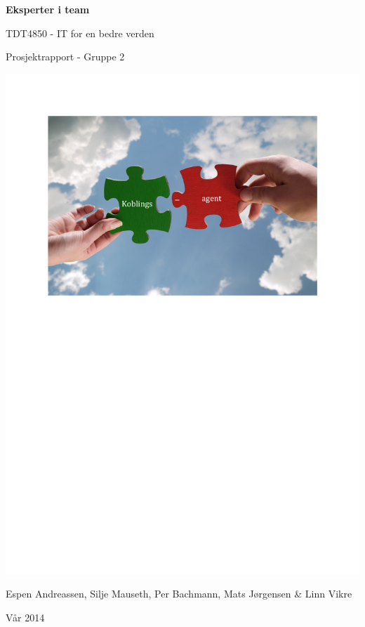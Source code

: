 \begin{titlepage}
\begin{center}
{\Huge {\bf Eksperter i team}}
\par
\vspace{0.1in}
{\LARGE TDT4850 - IT for en bedre verden}
\par
{\LARGE Prosjektrapport - Gruppe 2}
\par

\vspace{0.35in}

\includegraphics[scale=1.05, trim=3.5cm 19cm 0cm 1cm]{Prosjektforside.pdf}

\par

\vfill{}
\vspace{0.65in}
Espen Andreassen, Silje Mauseth, Per Bachmann, Mats Jørgensen \& Linn Vikre
\par
Vår 2014
\end{center}
\end{titlepage}
